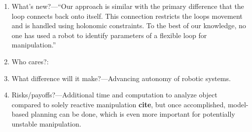 \documentclass[runningheads,a4paper]{llncs}
\begin{document}
\begin{enumerate}
\begin{enumerate}
\end{enumerate}
\item What's new?---``Our approach is similar with the primary difference that the loop connects back onto itself.  This connection restricts the loops movement and is handled using holonomic constraints.  To the best of our knowledge, no one has used a robot to identify parameters of a flexible loop for manipulation.''
\item Who cares?:
\item What difference will it make?---Advancing autonomy of robotic systems.
\item Risks/payoffs?---Additional time and computation to analyze object compared to solely reactive manipulation \textbf{cite}, but once accomplished, model-based planning can be done, which is even more important for potentially unstable manipulation.
\end{enumerate}

\newpage
\end{document}
